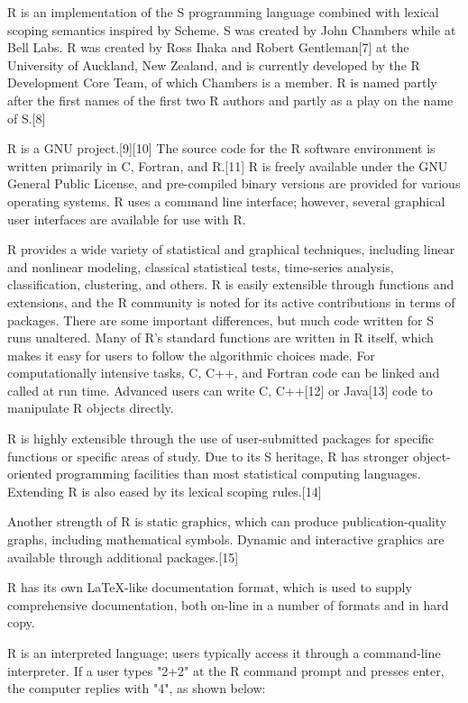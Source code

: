 \vpara
R is an implementation of the S programming language combined with lexical scoping semantics inspired by Scheme. S was created by John Chambers while at Bell Labs. R was created by Ross Ihaka and Robert Gentleman[7] at the University of Auckland, New Zealand, and is currently developed by the R Development Core Team, of which Chambers is a member. R is named partly after the first names of the first two R authors and partly as a play on the name of S.[8]

\vpara
R is a GNU project.[9][10] The source code for the R software environment is written primarily in C, Fortran, and R.[11] R is freely available under the GNU General Public License, and pre-compiled binary versions are provided for various operating systems. R uses a command line interface; however, several graphical user interfaces are available for use with R.

\vpara
R provides a wide variety of statistical and graphical techniques, including linear and nonlinear modeling, classical statistical tests, time-series analysis, classification, clustering, and others. R is easily extensible through functions and extensions, and the R community is noted for its active contributions in terms of packages. There are some important differences, but much code written for S runs unaltered. Many of R's standard functions are written in R itself, which makes it easy for users to follow the algorithmic choices made. For computationally intensive tasks, C, C++, and Fortran code can be linked and called at run time. Advanced users can write C, C++[12] or Java[13] code to manipulate R objects directly.

\vpara
R is highly extensible through the use of user-submitted packages for specific functions or specific areas of study. Due to its S heritage, R has stronger object-oriented programming facilities than most statistical computing languages. Extending R is also eased by its lexical scoping rules.[14]

\vpara
Another strength of R is static graphics, which can produce publication-quality graphs, including mathematical symbols. Dynamic and interactive graphics are available through additional packages.[15]

\vpara
R has its own LaTeX-like documentation format, which is used to supply comprehensive documentation, both on-line in a number of formats and in hard copy.

\vpara
R is an interpreted language; users typically access it through a command-line interpreter. If a user types "2+2" at the R command prompt and presses enter, the computer replies with "4", as shown below:

